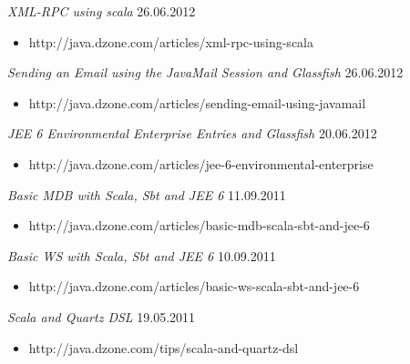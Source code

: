 \documentclass{res}
\begin{document}
\begin{resume}
{{\sl XML-RPC using scala}  \hfill    26.06.2012	\\
\vspace{-5mm}  \begin{itemize}
\item[]  \scriptsize http://java.dzone.com/articles/xml-rpc-using-scala
\end{itemize}
\vspace{-2mm}

{\sl Sending an Email using the JavaMail Session and Glassfish}  \hfill    26.06.2012 \\
\vspace{-5mm}  \begin{itemize}
\item[]  \scriptsize http://java.dzone.com/articles/sending-email-using-javamail
\end{itemize}
\vspace{-2mm}

{\sl JEE 6 Environmental Enterprise Entries and Glassfish}  \hfill    20.06.2012	\\
\vspace{-5mm}  \begin{itemize}
\item[]  \scriptsize http://java.dzone.com/articles/jee-6-environmental-enterprise
\end{itemize}
\vspace{-2mm}

{\sl Basic MDB with Scala, Sbt and JEE 6}  \hfill   11.09.2011	\\
\vspace{-5mm}  \begin{itemize}
\item[]  \scriptsize http://java.dzone.com/articles/basic-mdb-scala-sbt-and-jee-6
\end{itemize}
\vspace{-2mm}

{\sl Basic WS with Scala, Sbt and JEE 6}  \hfill   10.09.2011	\\
\vspace{-5mm}  \begin{itemize}
\item[]  \scriptsize http://java.dzone.com/articles/basic-ws-scala-sbt-and-jee-6
\end{itemize}
\vspace{-2mm}

{\sl Scala and Quartz DSL}  \hfill   19.05.2011	\\
\vspace{-5mm}  \begin{itemize}
\item[]  \scriptsize http://java.dzone.com/tips/scala-and-quartz-dsl
\end{itemize}
\vspace{-2mm}

}
\end{resume}
\end{document}
